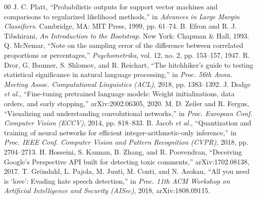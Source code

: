 \documentclass[conference]{IEEEtran}
\begin{document}
\begin{thebibliography}{00}
 J. C. Platt, ``Probabilistic outputs for support vector machines and comparisons to regularized likelihood methods,'' in \textit{Advances in Large Margin Classifiers}. Cambridge, MA: MIT Press, 1999, pp. 61--74.
 B. Efron and R. J. Tibshirani, \textit{An Introduction to the Bootstrap}. New York: Chapman \& Hall, 1993.
 Q. McNemar, ``Note on the sampling error of the difference between correlated proportions or percentages,'' \textit{Psychometrika}, vol. 12, no. 2, pp. 153--157, 1947.
 R. Dror, G. Baumer, S. Shlomov, and R. Reichart, ``The hitchhiker's guide to testing statistical significance in natural language processing,'' in \textit{Proc. 56th Annu. Meeting Assoc. Computational Linguistics (ACL)}, 2018, pp. 1383--1392.
 J. Dodge \textit{et al.}, ``Fine-tuning pretrained language models: Weight initializations, data orders, and early stopping,'' arXiv:2002.06305, 2020.
 M. D. Zeiler and R. Fergus, ``Visualizing and understanding convolutional networks,'' in \textit{Proc. European Conf. Computer Vision (ECCV)}, 2014, pp. 818--833.
 B. Jacob \textit{et al.}, ``Quantization and training of neural networks for efficient integer-arithmetic-only inference,'' in \textit{Proc. IEEE Conf. Computer Vision and Pattern Recognition (CVPR)}, 2018, pp. 2704--2713.
 H. Hosseini, S. Kannan, B. Zhang, and R. Poovendran, ``Deceiving Google's Perspective API built for detecting toxic comments,'' arXiv:1702.08138, 2017.
 T. Gr\"ondahl, L. Pajola, M. Juuti, M. Conti, and N. Asokan, ``All you need is `love': Evading hate speech detection,'' in \textit{Proc. 11th ACM Workshop on Artificial Intelligence and Security (AISec)}, 2018, arXiv:1808.09115.
\end{thebibliography}
\end{document}

